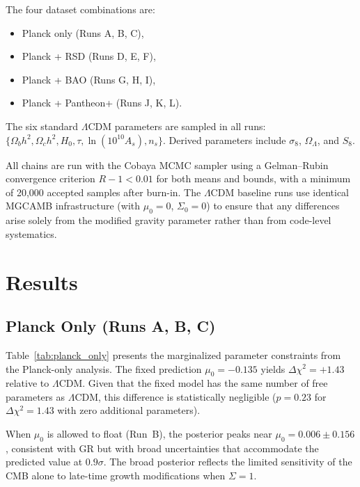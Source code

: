 \documentclass[11pt]{article}
\begin{document}
The four dataset combinations are:
\begin{itemize}
\item Planck only (Runs A, B, C),
\item Planck + RSD (Runs D, E, F),
\item Planck + BAO (Runs G, H, I),
\item Planck + Pantheon+ (Runs J, K, L).
\end{itemize}

The six standard $\Lambda$CDM parameters are sampled in all runs: $\{\Omega_b h^2, \Omega_c h^2, H_0, \tau, \ln(10^{10}A_s), n_s\}$.
Derived parameters include $\sigma_8$, $\Omega_\Lambda$, and $S_8$.

All chains are run with the Cobaya MCMC sampler \citep{Cobaya} using a Gelman--Rubin convergence criterion $R - 1 < 0.01$ for both means and bounds, with a minimum of 20,000 accepted samples after burn-in.
The $\Lambda$CDM baseline runs use identical MGCAMB infrastructure (with $\mu_0 = 0$, $\Sigma_0 = 0$) to ensure that any differences arise solely from the modified gravity parameter rather than from code-level systematics.


\section{Results}
\label{sec:results}

\subsection{Planck Only (Runs A, B, C)}
\label{sec:planck_only}

Table~\ref{tab:planck_only} presents the marginalized parameter constraints from the Planck-only analysis.
The fixed prediction $\mu_0 = -0.135$ yields $\Delta\chi^2 = +1.43$ relative to $\Lambda$CDM.
Given that the fixed model has the same number of free parameters as $\Lambda$CDM, this difference is statistically negligible ($p = 0.23$ for $\Delta\chi^2 = 1.43$ with zero additional parameters).

When $\mu_0$ is allowed to float (Run~B), the posterior peaks near $\mu_0 = 0.006 \pm 0.156$, consistent with GR but with broad uncertainties that accommodate the predicted value at $0.9\sigma$.
The broad posterior reflects the limited sensitivity of the CMB alone to late-time growth modifications when $\Sigma = 1$.
\end{document}
